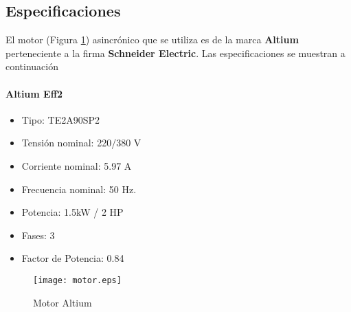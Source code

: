 \subsection{Especificaciones}
	El motor (Figura \ref{fig:motor}) asincrónico que se utiliza es de la marca \textbf{Altium} perteneciente a la firma \textbf{Schneider Electric}. Las especificaciones se muestran a continuación
	\paragraph*{Altium Eff2}
	\begin{itemize}
		\item 	Tipo: TE2A90SP2
		\item   Tensión nominal: 220/380 V
		\item 	Corriente nominal: 5.97 A 
		\item	Frecuencia nominal:  50 Hz.
		\item 	Potencia: 1.5kW / 2 HP
		\item 	Fases: 3
		\item   Factor de Potencia: 0.84
	\end{itemize}
	
	\begin{figure}[h!]
		\centering
		\texttt{[image: motor.eps]}
		\caption{Motor Altium}
		\label{fig:motor}
	\end{figure}
	\newpage